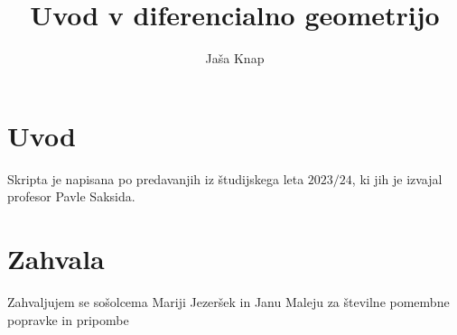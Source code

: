 \documentclass[10pt, a4paper]{article}
\begin{document}
\title{Uvod v diferencialno geometrijo}
\author{Jaša Knap}
\maketitle

\section*{Uvod}
Skripta je napisana po predavanjih iz študijskega leta $2023/24$, ki jih je izvajal profesor Pavle Saksida. 

\section*{Zahvala}
Zahvaljujem se sošolcema Mariji Jezeršek in Janu Maleju za številne pomembne popravke in pripombe  





\end{document}
